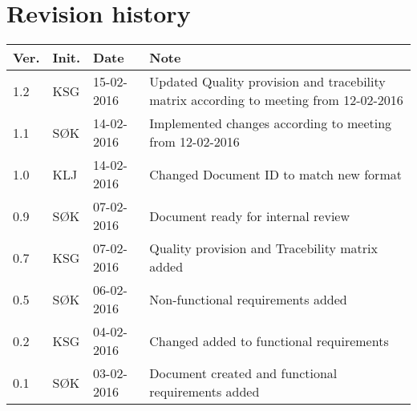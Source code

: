 \label{chp_revisionHistory}
\chapter{Revision history}

\begin{tabular}{b{1cm} b{1cm} b{2cm} b{8cm}}
    \textbf{Ver.} & \textbf{Init.} & \textbf{Date} & \textbf{Note} \\
    \hline
    1.2 & KSG & 15-02-2016 & Updated Quality provision and tracebility matrix according to meeting from 12-02-2016 \\
    1.1 & SØK & 14-02-2016 & Implemented changes according to meeting from 12-02-2016 \\ 
    1.0 & KLJ & 14-02-2016 & Changed Document ID to match new format \\
    0.9 & SØK & 07-02-2016 & Document ready for internal review \\
    0.7 & KSG & 07-02-2016 & Quality provision and Tracebility matrix added \\
    0.5 & SØK & 06-02-2016 & Non-functional requirements added \\
	0.2 & KSG & 04-02-2016 & Changed added to functional requirements \\
    0.1 & SØK  & 03-02-2016 & Document created and functional requirements added  \\
\end{tabular}